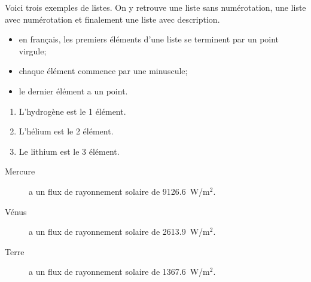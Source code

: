 \documentclass[french]{article}
\begin{document}
	Voici trois exemples de listes. On y retrouve une 
	liste sans numérotation, une liste avec numérotation 
	et finalement une liste avec description.
	
	\begin{itemize}
		\item en français, les premiers éléments d'une 
		liste se terminent par un point virgule;
		\item chaque élément commence par une minuscule;
		\item le dernier élément a un point.
	\end{itemize}
	
	\begin{enumerate}
		\item L’hydrogène est le 1\ier{} élément.
		\item L’hélium est le 2\ieme{} élément.
		\item Le lithium est le 3\ieme{} élément.
	\end{enumerate}
	
	\begin{description}
		\item[Mercure] a un flux de rayonnement solaire de 9126.6~W/m$^2$.
		\item[Vénus] a un flux de rayonnement solaire de 2613.9~W/m$^2$.
		\item[Terre] a un flux de rayonnement solaire de 1367.6~W/m$^2$.
	\end{description}
\end{document}
